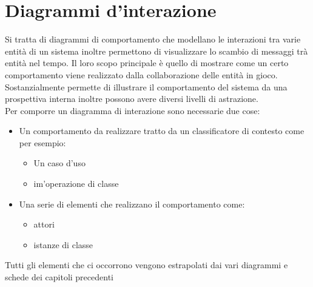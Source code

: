 \documentclass[a4paper, 11pt,oneside,]{book}
\begin{document}
\chapter{Diagrammi d'interazione}
    Si tratta di diagrammi di comportamento che modellano le interazioni tra varie entità di un sistema inoltre permettono di visualizzare
    lo scambio di messaggi trà entità nel tempo. Il loro scopo principale è quello di mostrare come un certo comportamento viene realizzato dalla collaborazione
    delle entità in gioco.\\
    Sostanzialmente permette di illustrare il comportamento del sistema da una prospettiva interna inoltre possono avere diversi livelli di astrazione.\\
    Per comporre un diagramma di interazione sono necessarie due cose:
    \begin{itemize}
        \item Un comportamento da realizzare tratto da un classificatore di contesto come per esempio:
        \begin{itemize}
            \item Un caso d'uso
            \item im'operazione di classe
        \end{itemize}
        \item Una serie di elementi che realizzano il comportamento come:
        \begin{itemize}
            \item attori
            \item istanze di classe
        \end{itemize}
    \end{itemize}
    Tutti gli elementi che ci occorrono vengono estrapolati dai vari diagrammi e schede dei capitoli precedenti
\end{document}
